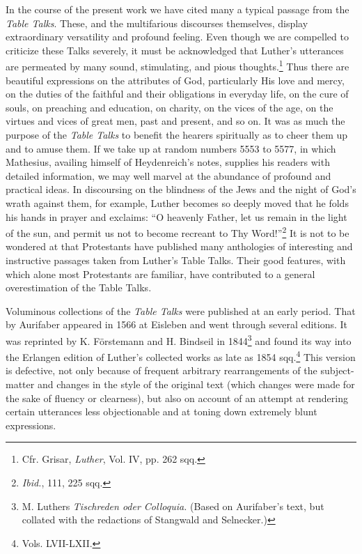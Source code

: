 In the course of the present work we have cited many a typical
passage from the \textit{Table Talks}. These, and the multifarious discourses
themselves, display extraordinary versatility and profound feeling.
Even though we are compelled to criticize these Talks severely, it
must be acknowledged that Luther’s utterances are permeated by
many sound, stimulating, and pious thoughts.\footnote{Cfr. Grisar, \textit{Luther}, Vol. IV, pp. 262 sqq.}
 Thus there are beautiful
expressions on the attributes of God, particularly His love and
mercy, on the duties of the faithful and their obligations in everyday
life, on the cure of souls, on preaching and education, on charity,
on the vices of the age, on the virtues and vices of great men, past and
present, and so on. It was as much the purpose of the \textit{Table Talks}
to benefit the hearers spiritually as to cheer them up and to amuse
them. If we take up at random numbers 5553 to 5577, in which
Mathesius, availing himself of Heydenreich’s notes, supplies his readers
with detailed information, we may well marvel at the abundance
of profound and practical ideas. In discoursing on the blindness of
the Jews and the night of God’s wrath against them, for example,
Luther becomes so deeply moved that he folds his hands in prayer
and exclaims: “O heavenly Father, let us remain in the light of the
sun, and permit us not to become recreant to Thy Word!”\footnote{\textit{Ibid.}, 111, 225 sqq.}
 It is not
to be wondered at that Protestants have published many anthologies
of interesting and instructive passages taken from Luther’s Table
Talks. Their good features, with which alone most Protestants are
familiar, have contributed to a general overestimation of the Table
Talks.

Voluminous collections of the \textit{Table Talks} were published at an
early period. That by Aurifaber appeared in 1566 at Eisleben and
went through several editions. It was reprinted by K. Förstemann and
H. Bindseil in 1844\footnote
{M. Luthers \textit{Tischreden oder Colloquia.} (Based on Aurifaber’s text, but collated with
the redactions of Stangwald and Selnecker.)}
and found its way into the Erlangen edition
of Luther’s collected works as late as 1854 sqq.\footnote{Vols. LVII-LXII.}
 This version is defective,
not only because of frequent arbitrary rearrangements of the
subject-matter and changes in the style of the original text (which
changes were made for the sake of fluency or clearness), but also on
account of an attempt at rendering certain utterances less objectionable
and at toning down extremely blunt expressions.

